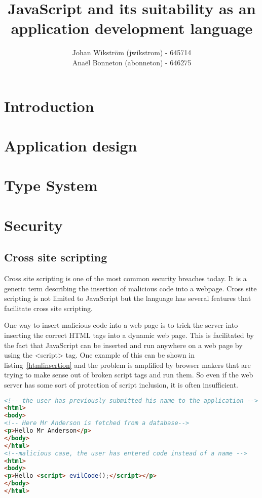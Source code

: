 \documentclass{report}
\title{JavaScript and its suitability as an application development language}
\author{Johan Wikström (jwikstrom) - 645714\\
Anaël Bonneton (abonneton) - 646275 
}
\begin{document}
\maketitle
\tableofcontents

\section{Introduction}


\section{Application design}


\section{Type System}


\section{Security}


\subsection{Cross site scripting}
Cross site scripting is one of the most common security breaches today. It is a generic term describing the insertion of malicious code into a webpage. Cross site scripting is not limited to JavaScript but the language has several features that facilitate cross site scripting.

One way to insert malicious code into a web page is to trick the server into inserting the correct HTML tags into a dynamic web page. This is facilitated by the fact that JavaScript can be inserted and run anywhere on a web page by using the <script> tag. One example of this can be shown in listing~\ref{htmlinsertion} and the problem is amplified by browser makers that are trying to make sense out of broken script tags and run them. So even if the web server has some sort of protection of script inclusion, it is often insufficient.
\begin{lstlisting}[caption={Insertion of malicious script on the server side},label={htmlinsertion},language={html}]
<!-- the user has previously submitted his name to the application -->
<html>
<body>
<!-- Here Mr Anderson is fetched from a database-->
<p>Hello Mr Anderson</p> 
</body>
</html>
<!--malicious case, the user has entered code instead of a name -->
<html>
<body>
<p>Hello <script> evilCode();</script></p>
</body>
</html>
\end{lstlisting}
\end{document}
